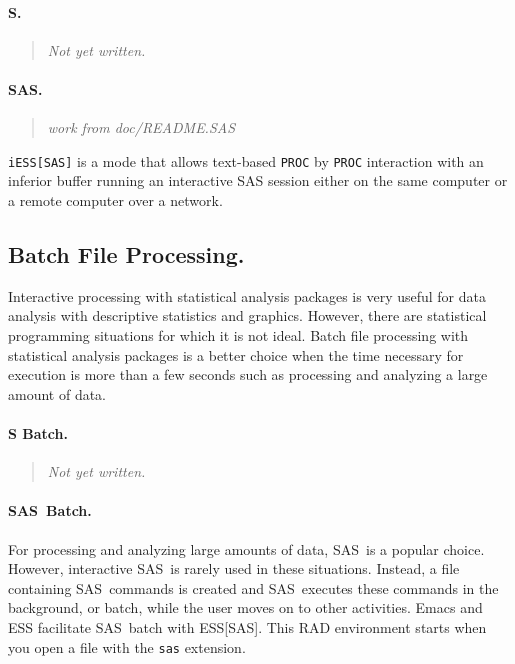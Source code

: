 \documentclass{article}
\newcommand*{\SAS}{\textsc{SAS}}
\newcommand{\stexttt}[1]{{\small\texttt{#1}}}
\newenvironment{Comment}{\begin{quote}\small\itshape }{\end{quote}}
\begin{document}
\paragraph{S.}
\begin{Comment}
Not yet written.
\end{Comment}

\paragraph{SAS.}

\begin{Comment} work from doc/README.SAS \end{Comment}
\stexttt{iESS[SAS]} is a mode that allows text-based \stexttt{PROC} by
\stexttt{PROC} interaction with an inferior buffer running an interactive SAS
session either on the same computer or a remote computer over a network.


\subsection{Batch File Processing.}
\label{sec:batch-file}

Interactive processing with statistical analysis packages is very
useful for data analysis with descriptive statistics and graphics.
However, there are statistical programming situations for which it
is not ideal.  Batch file processing with statistical analysis
packages is a better choice when the time necessary for execution
is more than a few seconds such as processing and analyzing a
large amount of data.

\paragraph{S Batch.}
\begin{Comment}
Not yet written.
\end{Comment}


\paragraph{\SAS\ Batch.}
\label{sec:sas-batch}

For processing and analyzing large amounts of data, \SAS\ is a popular
choice.  However, interactive \SAS\ is rarely used in these situations.
Instead, a file containing \SAS\ commands is created and \SAS\ executes
these commands in the background, or batch, while the user moves on to 
other activities.  Emacs and ESS facilitate \SAS\ batch with ESS[SAS].  
This RAD environment starts when you open a file with the \stexttt{sas}
extension.
\end{document}
